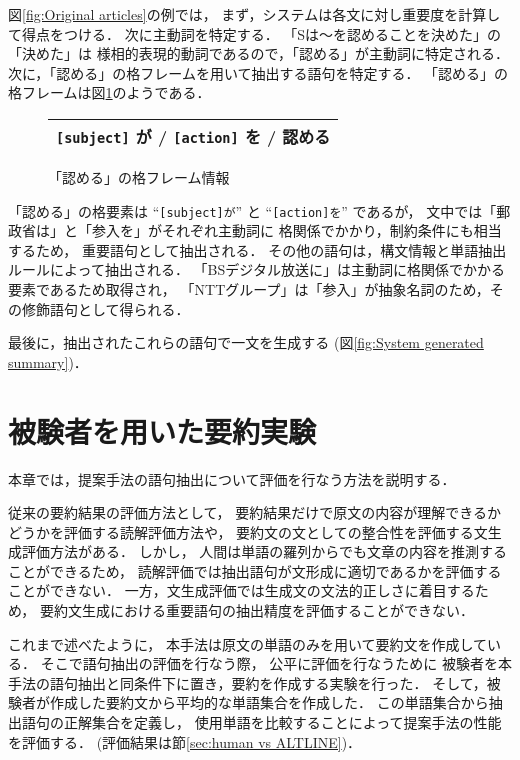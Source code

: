 図\ref{fig:Original articles}の例では，
まず，システムは各文に対し重要度を計算して得点をつける．
次に主動詞を特定する．
「Sは〜を認めることを決めた」の「決めた」は
様相的表現的動詞であるので，「認める」が主動詞に特定される．
次に，「認める」の格フレームを用いて抽出する語句を特定する．
「認める」の格フレームは図\ref{fig:Case-frame}のようである．

\begin{figure}[!htbp]
\begin{center}
\begin{tabular}{c}
\hline
{\tt [subject]} が /  {\tt [action]} を / 認める \\
\hline
\end{tabular}
\vspace{2mm}
\caption{「認める」の格フレーム情報}
\label{fig:Case-frame}
\end{center}
\end{figure}

「認める」の格要素は
``{\tt [subject]が}'' と ``{\tt [action]を}'' であるが，
文中では「郵政省は」と「参入を」がそれぞれ主動詞に
格関係でかかり，制約条件にも相当するため，
重要語句として抽出される．
その他の語句は，構文情報と単語抽出ルールによって抽出される．
「BSデジタル放送に」は主動詞に格関係でかかる要素であるため取得され，
「NTTグループ」は「参入」が抽象名詞のため，その修飾語句として得られる．

最後に，抽出されたこれらの語句で一文を生成する
(図\ref{fig:System generated summary})．

\section{被験者を用いた要約実験}
\label{sec:Human-written summary}

本章では，提案手法の語句抽出について評価を行なう方法を説明する．

従来の要約結果の評価方法として，
要約結果だけで原文の内容が理解できるかどうかを評価する読解評価方法や，
要約文の文としての整合性を評価する文生成評価方法がある．
しかし，
人間は単語の羅列からでも文章の内容を推測することができるため，
読解評価では抽出語句が文形成に適切であるかを評価することができない．
一方，文生成評価では生成文の文法的正しさに着目するため，
要約文生成における重要語句の抽出精度を評価することができない．

これまで述べたように，
本手法は原文の単語のみを用いて要約文を作成している．
そこで語句抽出の評価を行なう際，
公平に評価を行なうために
被験者を本手法の語句抽出と同条件下に置き，要約を作成する実験を行った．
そして，被験者が作成した要約文から平均的な単語集合を作成した．
この単語集合から抽出語句の正解集合を定義し，
使用単語を比較することによって提案手法の性能を評価する．
(評価結果は節\ref{sec:human vs ALTLINE})．

